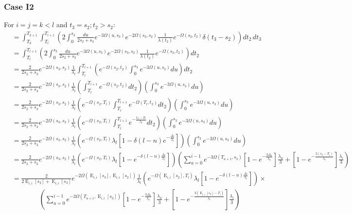 \documentclass{article}
\DeclareMathOperator{\E}{E}
\begin{document}
\subsubsection{Case I2}
For $i=j=k<l$ and $t_3=s_2;t_2>s_2$:
\begin{align*}
    &=\int_{T_k}^{T_{k+1}}\int_{T_l}^{T_{l+1}}\left(
    2\int_0^{s_3}\frac{du}{2s_2+s_3}e^{-3\Omega(u,s_3)}e^{-2\Omega(s_3,s_2)}\frac{1}{\lambda(t_2)}e^{-\Omega(s_2,t_2)}\delta(t_3-s_2)
    \right)dt_2\,dt_3\\
    &=\int_{T_l}^{T_{l+1}}\left(
    2\int_0^{s_3}\frac{du}{2s_2+s_3}e^{-3\Omega(u,s_3)}e^{-2\Omega(s_3,s_2)}\frac{1}{\lambda(t_2)}e^{-\Omega(s_2,t_2)}
    \right)dt_2\\
    &=\frac{2}{2s_2+s_3}e^{-2\Omega(s_3,s_2)}\frac{1}{\lambda_l}
    \int_{T_l}^{T_{l+1}}\left(
    e^{-\Omega(s_2,t_2)}\int_0^{s_3}e^{-3\Omega(u,s_3)}du
    \right)dt_2\\
    &=\frac{2}{2s_2+s_3}e^{-2\Omega(s_3,s_2)}\frac{1}{\lambda_l}
    \left(\int_{T_l}^{T_{l+1}}e^{-\Omega(s_2,t_2)}dt_2\right)
    \left(\int_0^{s_3}e^{-3\Omega(u,s_3)}du\right)\\
    &=\frac{2}{2s_2+s_3}e^{-2\Omega(s_3,s_2)}\frac{1}{\lambda_l}
    \left(e^{-\Omega(s_2,T_l)}\int_{T_l}^{T_{l+1}}e^{-\Omega(T_l,t_2)}dt_2\right)
    \left(\int_0^{s_3}e^{-3\Omega(u,s_3)}du\right)\\
    &=\frac{2}{2s_2+s_3}e^{-2\Omega(s_3,s_2)}\frac{1}{\lambda_l}
    \left(e^{-\Omega(s_2,T_l)}\int_{T_l}^{T_{l+1}}e^{-\frac{t_2-T_l}{\lambda_l}}dt_2\right)
    \left(\int_0^{s_3}e^{-3\Omega(u,s_3)}du\right)\\
    &=\frac{2}{2s_2+s_3}e^{-2\Omega(s_3,s_2)}\frac{1}{\lambda_l}
    \left(e^{-\Omega(s_2,T_l)}\lambda_l\left[1-\delta(l-n)e^{-\frac{\Delta_l}{\lambda_l}}\right]\right)
    \left(\int_0^{s_3}e^{-3\Omega(u,s_3)}du\right)\\
    &=\frac{2}{2s_2+s_3}e^{-2\Omega(s_3,s_2)}\frac{1}{\lambda_l}
    \left(e^{-\Omega(s_2,T_l)}\lambda_l\left[1-e^{-\delta(l-n)\frac{\Delta_l}{\lambda_l}}\right]\right)
    \left(\sum_{a=0}^{i-1} e^{-3\Omega(T_{a+1},s_3)}
    \left[1-e^{-\frac{3 \Delta_a}{\lambda_a}}\right]\frac{\lambda_a}{3}+
    \left[1-e^{-\frac{3 \left(s_3-T_{i}\right)}{\lambda_{i}}}\right]\frac{\lambda_{i}}{3}\right)\\
    &=\frac{2}{2\E_{i,i}[s_2]+\E_{i,i}[s_3]}e^{-2\Omega(\E_{i,i}[s_3],\E_{i,i}[s_2])}\frac{1}{\lambda_l}
    \left(e^{-\Omega(\E_{i,i}[s_2],T_l)}\lambda_l\left[1-e^{-\delta(l-n)\frac{\Delta_l}{\lambda_l}}\right]\right)\times\\
    &\qquad\qquad\left(\sum_{a=0}^{i-1} e^{-3\Omega(T_{a+1},\E_{i,i}[s_3])}
    \left[1-e^{-\frac{3 \Delta_a}{\lambda_a}}\right]\frac{\lambda_a}{3}+
    \left[1-e^{-\frac{3 \left(\E_{i,i}[s_3]-T_{i}\right)}{\lambda_{i}}}\right]\frac{\lambda_{i}}{3}\right)\\
    \\
\end{align*}
\end{document}
